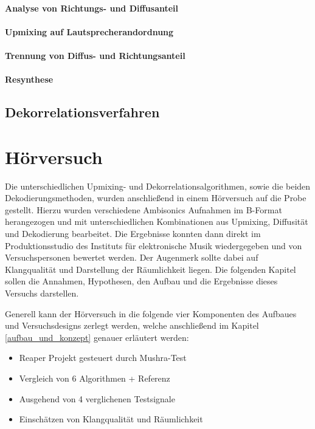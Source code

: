 \documentclass[12pt, a4paper]{article}
\begin{document}
        \paragraph{Analyse von Richtungs- und Diffusanteil}
        
        \paragraph{Upmixing auf Lautsprecherandordnung}
        
        \paragraph{Trennung von Diffus- und Richtungsanteil}
        
        \paragraph{Resynthese}
        

    \subsection{Dekorrelationsverfahren} \label{dekorrelation}
    


\section{Hörversuch}
Die unterschiedlichen Upmixing- und Dekorrelationsalgorithmen, sowie die beiden Dekodierungsmethoden, wurden anschließend in einem Hörversuch auf die Probe gestellt. Hierzu wurden verschiedene Ambisonics Aufnahmen im B-Format herangezogen und mit unterschiedlichen Kombinationen aus Upmixing, Diffusität und Dekodierung bearbeitet. Die Ergebnisse konnten dann direkt im Produktionsstudio des Instituts für elektronische Musik wiedergegeben und von Versuchspersonen bewertet werden. Der Augenmerk sollte dabei auf Klangqualität und Darstellung der Räumlichkeit liegen. Die folgenden Kapitel sollen die Annahmen, Hypothesen, den Aufbau und die Ergebnisse dieses Versuchs darstellen.

Generell kann der Hörversuch in die folgende vier Komponenten des Aufbaues und Versuchsdesigns zerlegt werden, welche anschließend im Kapitel \ref{aufbau_und_konzept} genauer erläutert werden:
\begin{itemize}
    \item Reaper Projekt gesteuert durch Mushra-Test
    \item Vergleich von 6 Algorithmen + Referenz
    \item Ausgehend von 4 verglichenen Testsignale
    \item Einschätzen von Klangqualität und Räumlichkeit
\end{itemize}
\end{document}
